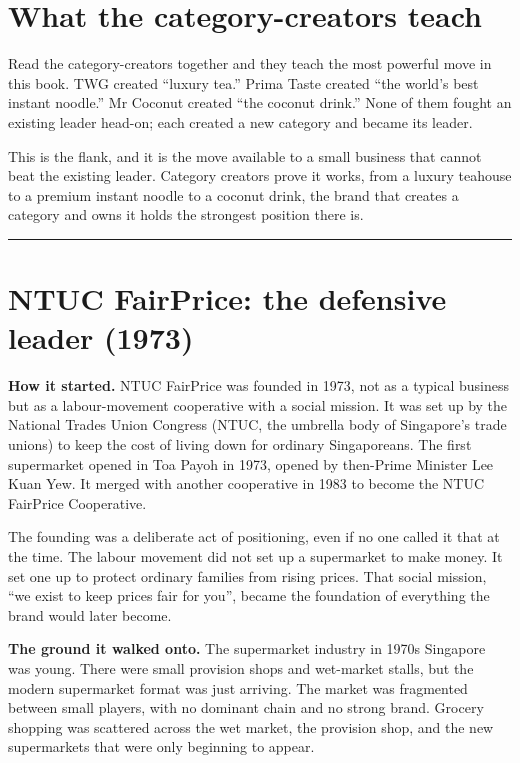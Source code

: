 \documentclass[10pt,twoside,openany]{memoir}
\newcommand{\needspacehead}{\needspace{4\baselineskip}}
\let\oldsection\section
\renewcommand{\section}{\needspacehead\oldsection}
\begin{document}
\section{What the category-creators
teach}\label{what-the-category-creators-teach}

Read the category-creators together and they teach the most powerful
move in this book. TWG created ``luxury tea.'' Prima Taste created ``the
world's best instant noodle.'' Mr Coconut created ``the coconut drink.''
None of them fought an existing leader head-on; each created a new
category and became its leader.

This is the flank, and it is the move available to a small business that
cannot beat the existing leader. Category creators prove it works, from
a luxury teahouse to a premium instant noodle to a coconut drink, the
brand that creates a category and owns it holds the strongest position
there is.

\begin{center}\rule{0.5\linewidth}{0.5pt}\end{center}

\section{NTUC FairPrice: the defensive leader
(1973)}\label{ntuc-fairprice-the-defensive-leader-1973}

\textbf{How it started.} NTUC FairPrice was founded in 1973, not as a
typical business but as a labour-movement cooperative with a social
mission. It was set up by the National Trades Union Congress (NTUC, the
umbrella body of Singapore's trade unions) to keep the cost of living
down for ordinary Singaporeans. The first supermarket opened in Toa
Payoh in 1973, opened by then-Prime Minister Lee Kuan Yew. It merged
with another cooperative in 1983 to become the NTUC FairPrice
Cooperative.

The founding was a deliberate act of positioning, even if no one called
it that at the time. The labour movement did not set up a supermarket to
make money. It set one up to protect ordinary families from rising
prices. That social mission, ``we exist to keep prices fair for you'',
became the foundation of everything the brand would later become.

\textbf{The ground it walked onto.} The supermarket industry in 1970s
Singapore was young. There were small provision shops and wet-market
stalls, but the modern supermarket format was just arriving. The market
was fragmented between small players, with no dominant chain and no
strong brand. Grocery shopping was scattered across the wet market, the
provision shop, and the new supermarkets that were only beginning to
appear.
\end{document}

